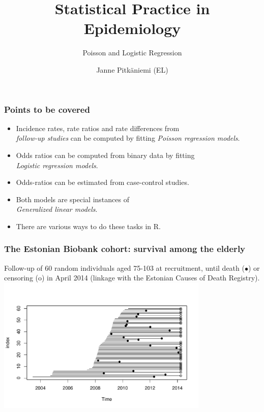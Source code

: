 \documentclass[handout,12pt,dvipsnames,t]{beamer}
\title{Statistical Practice in Epidemiology \newline }
\subtitle{Poisson and Logistic Regression} %
\author{Janne Pitk\"aniemi (EL) }
\date{}
\begin{document}
\lstset{basicstyle=\footnotesize}




\maketitle




\begin{frame}[fragile]
\frametitle{Points to be covered}

\begin{itemize}
\item Incidence rates, rate ratios and rate differences from\\ {\it follow-up studies}
 can be computed by fitting {\it Poisson regression models}.
\item Odds ratios can be computed from binary data by fitting \\ {\it Logistic regression models}.
\item Odds-ratios can be estimated from case-control studies.
\item Both models are special instances of \\
{\it Generalized linear models}.
\item There are various ways to do these tasks in R.
\end{itemize}

\end{frame}

\begin{frame}
\frametitle{The Estonian Biobank cohort: survival among the elderly}
Follow-up of 60 random individuals aged 75-103 at recruitment, until death ($\bullet$) or censoring (o) in April 2014 (linkage with the Estonian Causes of Death Registry). \\[-0.5cm]
\includegraphics[height=6.5cm]{over75lines}
\end{frame}
\end{document}
